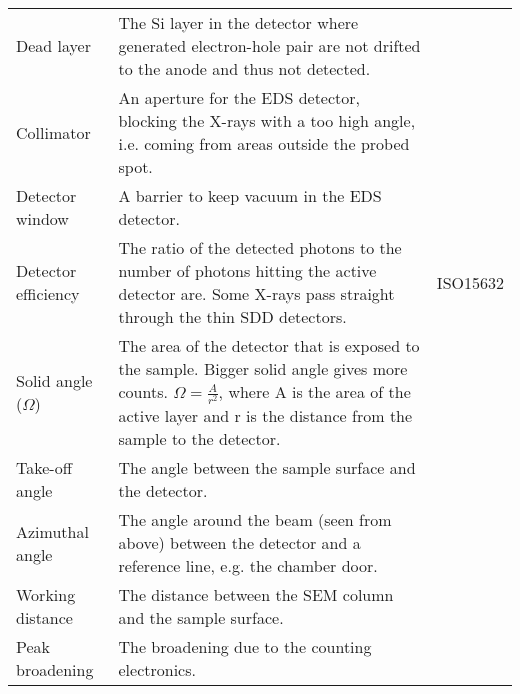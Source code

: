 \begin{table}[pht]
\begin{center}
\begin{tabular}{lp{10cm}l}
            Dead layer             & The Si layer in the detector where generated electron-hole pair are not drifted to the anode and thus not detected.                                                                                                    &                    \\
            Collimator             & An aperture for the EDS detector, blocking the X-rays with a too high angle, i.e. coming from areas outside the probed spot.                                                                                           &                    \\
            Detector window        & A barrier to keep vacuum in the EDS detector.                                                                                                                                                                          &                    \\
            Detector efficiency    & The ratio of the detected photons to the number of photons hitting the active detector are. Some X-rays pass straight through the thin SDD detectors.                                                                  & ISO15632           \\
            Solid angle ($\Omega$) & The area of the detector that is exposed to the sample. Bigger solid angle gives more counts. $\Omega = \frac{A}{r^2}$, where A is the area of the active layer and r is the distance from the sample to the detector. &                    \\
            Take-off angle         & The angle between the sample surface and the detector.                                                                                                                                                                 &                    \\
            Azimuthal angle        & The angle around the beam (seen from above) between the detector and a reference line, e.g. the chamber door.                                                                                                          &                    \\
            Working distance       & The distance between the SEM column and the sample surface.                                                                                                                                                            &                    \\
            Peak broadening        & The broadening due to the counting electronics.                                                                                                                                                                        &                    \\
            \hline
        \end{tabular}
    \end{center}
\end{table}